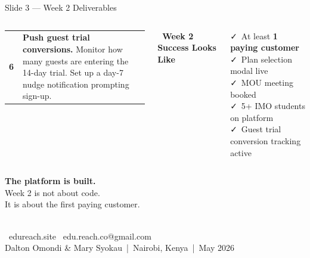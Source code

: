 \documentclass[aspectratio=169,13pt]{beamer}
\begin{document}
\begin{frame}{Slide 3 — Week 2 Deliverables}
\begin{columns}[T]
\begin{tabular}{@{}p{0.07\linewidth}p{0.85\linewidth}@{}}
    \textbf{\textcolor{slate}{6}} &
      \scriptsize \textbf{Push guest trial conversions.}
      Monitor how many guests are entering the 14-day trial.
      Set up a day-7 nudge notification prompting sign-up.\\[6pt]

  \end{tabular}

  \vspace{6pt}
  \textcolor{indigodark}{\textbf{\faFlag\ Week 2 Success Looks Like}}\\[4pt]
  \colorbox{emeraldlight}{%
    \parbox{0.95\linewidth}{\scriptsize\color{emerald}
      \faCheck\ At least \textbf{1 paying customer}\\[2pt]
      \faCheck\ Plan selection modal live\\[2pt]
      \faCheck\ MOU meeting booked\\[2pt]
      \faCheck\ 5+ IMO students on platform\\[2pt]
      \faCheck\ Guest trial conversion tracking active
    }
  }

\end{columns}
\end{frame}

{
\begin{frame}[plain]
  \centering\vspace{1.1cm}
  {\Large\bfseries\color{white}The platform is built.}\\[0.3cm]
  {\normalsize\color{white!75}Week 2 is not about code.}\\[0.15cm]
  {\normalsize\color{white!75}It is about the first paying customer.}\\[0.8cm]
  \\[0.5cm]
  {\small\color{white!60}
    \faGlobe\ edureach.site\quad
    \faEnvelope\ edu.reach.co@gmail.com\\[0.2cm]
    Dalton Omondi \& Mary Syokau\ |\ Nairobi, Kenya\ |\ May 2026
  }
\end{frame}
}
\end{document}
